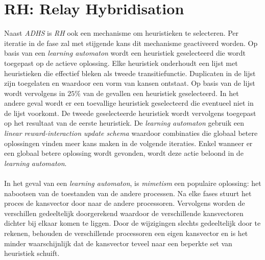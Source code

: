 \section{RH: Relay Hybridisation}

Naast \emph{ADHS} is \emph{RH} ook een mechanisme om heuristieken te selecteren. Per iteratie in de fase zal met stijgende kans dit mechanisme geactiveerd worden. Op basis van een \emph{learning automaton}\cite{RePEc:cla:levarc:481} wordt een heuristiek geselecteerd die wordt toegepast op de actieve oplossing. Elke heuristiek onderhoudt een lijst met heuristieken die effectief bleken als tweede transitiefunctie. Duplicaten in de lijst zijn toegelaten en waardoor een vorm van kansen ontstaat. Op basis van de lijst wordt vervolgens in $25\%$ van de gevallen een heuristiek geselecteerd. In het andere geval wordt er een toevallige heuristiek geselecteerd die eventueel niet in de lijst voorkomt. De tweede geselecteerde heuristiek wordt vervolgens toegepast op het resultaat van de eerste heuristiek. De \emph{learning automaton} gebruik een \emph{linear reward-interaction update schema} waardoor combinaties die globaal betere oplossingen vinden meer kans maken in de volgende iteraties. Enkel wanneer er een globaal betere oplossing wordt gevonden, wordt deze actie beloond in de \emph{learning automaton}.

\paragraph{}
In het geval van een \emph{learning automaton}, is \emph{mimetism} een populaire oplossing: het nabootsen van de toestanden van de andere processen. Na elke fases stuurt het proces de kansvector door naar de andere processoren. Vervolgens worden de verschillen gedeeltelijk doorgerekend waardoor de verschillende kansvectoren dichter bij elkaar komen te liggen. Door de wijzigingen slechts gedeeltelijk door te rekenen, behouden de verschillende processoren een eigen kansvector en is het minder waarschijnlijk dat de kansvector teveel naar een beperkte set van heuristiek schuift.